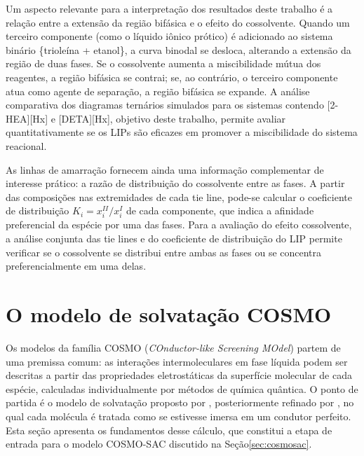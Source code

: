 Um aspecto relevante para a interpretação dos resultados deste trabalho é a relação entre a extensão da região bifásica e o efeito do cossolvente. Quando um terceiro componente (como o líquido iônico prótico) é adicionado ao sistema binário \{trioleína + etanol\}, a curva binodal se desloca, alterando a extensão da região de duas fases. Se o cossolvente aumenta a miscibilidade mútua dos reagentes, a região bifásica se contrai; se, ao contrário, o terceiro componente atua como agente de separação, a região bifásica se expande. A análise comparativa dos diagramas ternários simulados para os sistemas contendo [2-HEA][Hx] e [DETA][Hx], objetivo deste trabalho, permite avaliar quantitativamente se os LIPs são eficazes em promover a miscibilidade do sistema reacional.

As linhas de amarração fornecem ainda uma informação complementar de interesse prático: a razão de distribuição do cossolvente entre as fases. A partir das composições nas extremidades de cada tie line, pode-se calcular o coeficiente de distribuição $K_i = x_i^{II} / x_i^{I}$ de cada componente, que indica a afinidade preferencial da espécie por uma das fases\cite{treybal1980}. Para a avaliação do efeito cossolvente, a análise conjunta das tie lines e do coeficiente de distribuição do LIP permite verificar se o cossolvente se distribui entre ambas as fases ou se concentra preferencialmente em uma delas.

\section{O modelo de solvatação COSMO}
\label{sec:cosmo_solvatacao}

Os modelos da família COSMO (\textit{COnductor-like Screening MOdel}) partem de uma premissa comum: as interações intermoleculares em fase líquida podem ser descritas a partir das propriedades eletrostáticas da superfície molecular de cada espécie, calculadas individualmente por métodos de química quântica. O ponto de partida é o modelo de solvatação proposto por , posteriormente refinado por , no qual cada molécula é tratada como se estivesse imersa em um condutor perfeito. Esta seção apresenta os fundamentos desse cálculo, que constitui a etapa de entrada para o modelo COSMO-SAC discutido na Seção\ref{sec:cosmosac}.


